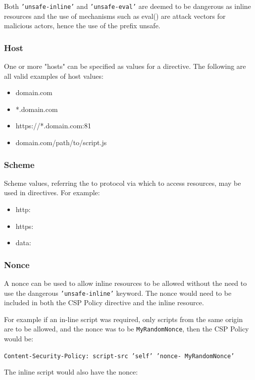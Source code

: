 \documentclass{mscreport}
\begin{document}
Both \texttt{'unsafe-inline'} and \texttt{'unsafe-eval'} are deemed to be dangerous as inline resources and the use of mechanisms such as eval() are attack vectors for malicious actors, hence the use of the prefix unsafe.

\subsubsection{Host}
One or more "hosts" can be specified as values for a directive. The following are all valid examples of host values:
\begin{itemize}
	\setlength\itemsep{0.1em}
	\item domain.com
	\item *.domain.com
	\item https://*.domain.com:81
	\item domain.com/path/to/script.js
\end{itemize}

\subsubsection{Scheme}
Scheme values, referring the to protocol via which to access resources, may be used in directives. For example:

\begin{itemize}
	\setlength\itemsep{0.1em}
	\item http:
	\item https:
	\item data:
\end{itemize}


\subsubsection{Nonce}
A nonce can be used to allow inline resources to be allowed without the need to use the dangerous \texttt{'unsafe-inline'} keyword. The nonce would need to be included in both the CSP Policy directive and the inline resource.

\vspace{0.3cm}
\noindent
For example if an in-line script was required, only scripts from the same origin are to be allowed, and the nonce was to be \texttt{MyRandomNonce}, then the CSP Policy would be:

\vspace{0.3cm}
\noindent
\texttt{Content-Security-Policy: script-src 'self' 'nonce- MyRandomNonce'}

\vspace{0.3cm}
\noindent
The inline script would also have the nonce:
\end{document}
